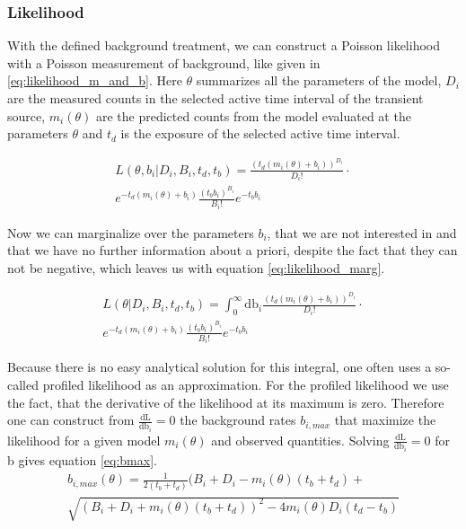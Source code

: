 \documentclass[twocolumn]{aa}
\begin{document}
\subsubsection*{Likelihood}

With the defined background treatment, we can construct a Poisson likelihood with a Poisson measurement of background, like given in \ref{eq:likelihood_m_and_b}. Here $\theta$ summarizes all the parameters of the model, $D_{i}$ are the measured counts in the selected active time interval of the transient source, $m_{i}(\theta)$ are the predicted counts from the model evaluated at the parameters $\theta$ and $t_{d}$ is the exposure of the selected active time interval.

\begin{multline}
	L(\theta, b_{i}|D_{i}, B_{i},t_{d},t_{b}) = \frac{(t_{d}(m_{i}(\theta)+ b_{i}))^{D_{i}}}{D_{i}!}\cdot \\
  e^{-t_{d}(m_{i}(\theta)+b_{i})}\frac{(t_{b} b_{i})^{B_{i}}}{B_{i}!} e^{-t_{b} b_{i}}
  \label{eq:likelihood_m_and_b}
\end{multline}

Now we can marginalize over the parameters $b_{i}$, that we are not interested in and that we have no further information about a priori, despite the fact that they can not be negative, which leaves us with equation \ref{eq:likelihood_marg}.

\begin{multline}
	L(\theta|D_{i}, B_{i},t_{d},t_{b}) = \int_{0}^{\infty}\textrm{db}_{i}\frac{(t_{d}(m_{i}(\theta)+ b_{i}))^{D_{i}}}{D_{i}!}\cdot\\
  e^{-t_{d}(m_{i}(\theta)+b_{i})} \frac{(t_{b} b_{i})^{B_{i}}}{B_{i}!} e^{-t_{b}b_{i}}
  \label{eq:likelihood_marg}
\end{multline}

Because there is no easy analytical solution for this integral, one often uses a so-called profiled likelihood as an approximation. For the profiled likelihood we use the fact, that the derivative of the likelihood at its maximum is zero. Therefore one can construct from $\frac{\textrm{dL}}{\textrm{db}_i}=0$ the background rates $b_{i, max}$ that maximize the likelihood for a given model $m_{i}(\theta)$ and observed quantities. Solving $\frac{\textrm{dL}}{\textrm{db}_i}=0$ for b gives equation \ref{eq:bmax}.
\begin{multline}
	b_{i,max}(\theta)=\frac{1}{2(t_{b}+t_{d})}(B_{i}+D_{i}-m_{i}(\theta)(t_{b}+t_{d})+\\
  \sqrt{(B_{i}+D_{i}+m_{i}(\theta)(t_{b}+t_{d}))^{2}-4m_{i}(\theta)D_{i}(t_{d}-t_{b})}
  \label{eq:bmax}
\end{multline}
\end{document}
